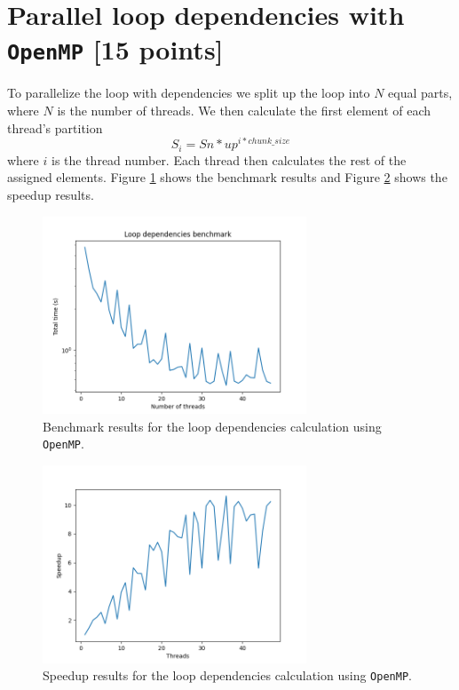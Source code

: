 \documentclass[unicode,11pt,a4paper,oneside,numbers=endperiod,openany]{scrartcl}
\begin{document}
\section{Parallel loop dependencies with \texttt{OpenMP} [15 points]}

To parallelize the loop with dependencies we split up the loop into $N$ equal parts, where $N$ is the number of threads. We then calculate the first element of each thread's partition
$$S_i = Sn * {up}^{i * chunk\_size}$$
where $i$ is the thread number. Each thread then calculates the rest of the assigned elements. Figure \ref{fig:loop_dependencies_benchmark} shows the benchmark results and Figure \ref{fig:loop_dependencies_speedup} shows the speedup results.

\begin{figure}[h]
    \centering
    \includegraphics[width=0.7\textwidth]{../code/loop-dependencies/benchmark.png}
    \caption{Benchmark results for the loop dependencies calculation using \texttt{OpenMP}.}
    \label{fig:loop_dependencies_benchmark}
\end{figure}
\begin{figure}[h]
    \centering
    \includegraphics[width=0.7\textwidth]{../code/loop-dependencies/speedup.png}
    \caption{Speedup results for the loop dependencies calculation using \texttt{OpenMP}.}
    \label{fig:loop_dependencies_speedup}
\end{figure}
\end{document}
